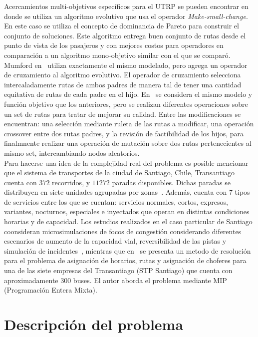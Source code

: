\documentclass{llncs}
\begin{document}
Acercamientos multi-objetivos espec\'ificos para el UTRP se pueden encontrar en~\cite{zhang2010multi} donde se utiliza un algoritmo
evolutivo que usa el operador \emph{Make-small-change}. En este caso se utiliza el concepto de dominancia de Pareto para construir
el conjunto de soluciones. Este algoritmo entrega buen conjunto de rutas desde el punto de vista de los pasajeros y con mejores costos
para operadores en comparaci\'on a un algoritmo mono-objetivo similar con el que se compar\'o. Mumford en~\cite{NewHaEOps} utiliza exactamente
el mismo modelado, pero agrega un operador de cruzamiento al algoritmo evolutivo. El operador de cruzamiento selecciona intercaladamente
rutas de ambos padres de manera tal de tener una cantidad equitativa de rutas de cada padre en el hijo. En~\cite{GAUTRP}
se considera el mismo modelo y funci\'on objetivo que los anteriores, pero 
se realizan diferentes operaciones sobre un set de rutas para tratar de mejorar su calidad. Entre las modificaciones
se encuentran: una selecci\'on mediante ruleta de las rutas a modificar, una operaci\'on crossover entre dos rutas padres,
y la revisi\'on de factibilidad de los hijos, para finalmnente realizar una operaci\'on de mutaci\'on sobre dos rutas pertenecientes
al mismo set, intercambiando nodos aleatorios.\\

Para hacerse una idea de la complejidad real del problema es posible mencionar que el sistema de transportes de la ciudad de Santiago, Chile,
Transantiago cuenta con $372$ recorridos, y $11272$ paradas disponibles. Dichas paradas se distribuyen en siete unidades agrupadas por
zonas~\cite{datosGob}. Adem\'as, cuenta con 7 tipos de servicios entre los que se cuentan: servicios normales, cortos, expresos, variantes,
nocturnos, especiales e inyectados que operan en distintas condiciones horarias y de capacidad. Los estudios realizados en el caso
particular de Santiago coonsideran microsimulaciones de focos de congesti\'on considerando
diferentes escenarios de aumento de la capacidad vial, reversibilidad de las pistas y simulaci\'on de incidentes~\cite{alarcon2010}, 
mientras que en~\cite{cortes2009} se presenta un metodo de resoluci\'on para el problema de asignaci\'on de horarios, rutas y asignaci\'on
de choferes para una de las siete empresas del Transantiago (STP Santiago) que cuenta con aproximadamente 300 buses.
El autor aborda el problema mediante MIP (Programaci\'on Entera Mixta).

\section{Descripción del problema}
\end{document}
